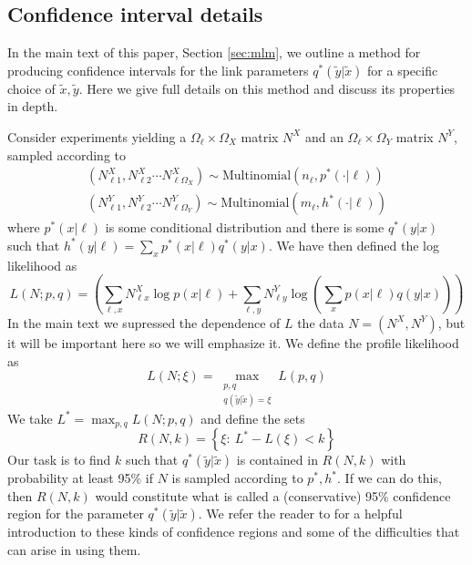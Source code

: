 \begin{itemize}



\appendix


%
 

\section{Confidence interval details}

\label{sec:confinterval}

In the main text of this paper, Section \ref{sec:mlm}, we outline a method for producing confidence intervals for the link parameters $q^*(\tilde y|\tilde x)$ for a specific choice of $\tilde x,\tilde y$.  Here we give full details on this method and discuss its properties in depth.

Consider experiments yielding a $\Omega_\ell\times\Omega_X$ matrix $N^X$ and an $\Omega_\ell \times \Omega_Y$ matrix $N^Y$, sampled according to
\begin{align*}
(N^X_{\ell 1},N^X_{\ell 2}\cdots N^X_{\ell \Omega_X}) \sim \mathrm{Multinomial}(n_\ell,p^*(\cdot | \ell))\\
(N^Y_{\ell 1},N^Y_{\ell 2}\cdots N^Y_{\ell \Omega_Y}) \sim \mathrm{Multinomial}(m_\ell,h^*(\cdot | \ell))
\end{align*}
where $p^*(x|\ell)$ is some conditional distribution and there is some $q^*(y|x)$ such that $h^*(y|\ell)=\sum_x p^*(x|\ell)q^*(y|x)$.  We have then defined the log likelihood as 
\[
L(N;p,q)=\left(\sum_{\ell,x} N^X_{\ell x} \log p(x|\ell) + \sum_{\ell,y} N^Y_{\ell y} \log \left(\sum_x p(x|\ell) q(y|x)\right)\right)
\]
In the main text we supressed the dependence of $L$ the data $N=(N^X,N^Y)$, but it will be important here so we will emphasize it.  We define the profile likelihood as
\[
L(N;\xi)=\max_{\substack{p,q \\ q(\tilde y|\tilde x)=\xi}} L(p,q)
\]
We take $L^*=\max_{p,q} L(N;p,q)$ and define the sets
\[
R(N,k) = \left\{\xi:\ L^* - L(\xi) < k\right\}
\]
Our task is to find $k$ such that $q^*(\tilde y|\tilde x)$ is contained in $R(N,k)$ with probability at least 95\% if $N$ is sampled according to $p^*,h^*$.  If we can do this, then $R(N,k)$ would constitute what is called a (conservative) 95\% confidence region for the parameter $q^*(\tilde y|\tilde x)$.  We refer the reader to \cite{brazzale2007applied} for a helpful introduction to these kinds of confidence regions and some of the difficulties that can arise in using them.


\end{itemize}
